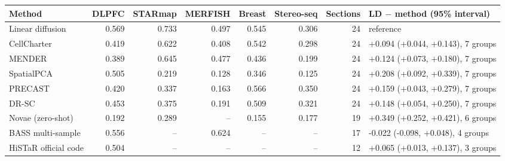 \begin{tabular}{lrrrrrrl}\toprule
Method & DLPFC & STARmap & MERFISH & Breast & Stereo-seq & Sections & LD $-$ method (95\% interval) \\\midrule
Linear diffusion & 0.569 & 0.733 & 0.497 & 0.545 & 0.306 & 24 & reference \\
CellCharter & 0.419 & 0.622 & 0.408 & 0.542 & 0.298 & 24 & +0.094 (+0.044, +0.143), 7 groups \\
MENDER & 0.389 & 0.645 & 0.477 & 0.436 & 0.199 & 24 & +0.124 (+0.073, +0.180), 7 groups \\
SpatialPCA & 0.505 & 0.219 & 0.128 & 0.346 & 0.125 & 24 & +0.208 (+0.092, +0.339), 7 groups \\
PRECAST & 0.420 & 0.337 & 0.163 & 0.566 & 0.350 & 24 & +0.159 (+0.043, +0.279), 7 groups \\
DR-SC & 0.453 & 0.375 & 0.191 & 0.509 & 0.321 & 24 & +0.148 (+0.054, +0.250), 7 groups \\
Novae (zero-shot) & 0.192 & 0.289 & -- & 0.155 & 0.177 & 19 & +0.349 (+0.252, +0.421), 6 groups \\
BASS multi-sample & 0.556 & -- & 0.624 & -- & -- & 17 & -0.022 (-0.098, +0.048), 4 groups \\
HiSTaR official code & 0.504 & -- & -- & -- & -- & 12 & +0.065 (+0.013, +0.137), 3 groups \\
\bottomrule\end{tabular}
